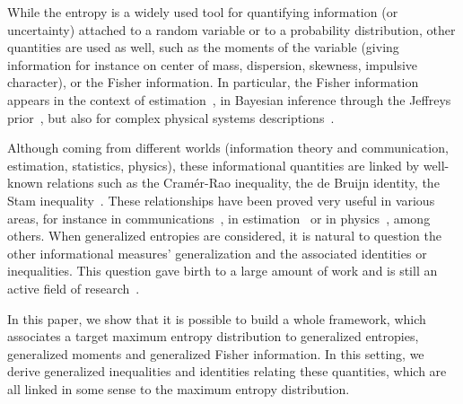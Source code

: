 \documentclass[entropy,article,submit,moreauthors,pdftex]{Definitions/mdpi}
\begin{document}
While  the  entropy is  a  widely  used  tool  for quantifying  information  (or
uncertainty) attached  to a  random variable or  to a  probability distribution,
other quantities are used  as well, such as the moments  of the variable (giving
information  for instance  on center  of mass,  dispersion, skewness,  impulsive
character), or  the Fisher information.   In particular, the  Fisher information
appears in the context of  estimation~\cite{Kay93, Fri04}, in Bayesian inference
through the  Jeffreys prior~\cite{Rob07, Jef46},  but also for  complex physical
systems  descriptions~\cite{Fri04,   VigBer03,  RomAng99,   RomSan06,  SanGon06,
  TorLop15}.


Although  coming from  different worlds  (information theory  and communication,
estimation, statistics,  physics), these informational quantities  are linked by
well-known  relations  such  as  the  Cram\'er-Rao  inequality,  the  de  Bruijn
identity, the Stam inequality~\cite{CovTho06, Sta59, DemCov91, GuoSha05}.  These
relationships have  been proved very  useful in  various areas, for  instance in
communications~\cite{Sta59, DemCov91,  CovTho06}, in  estimation~\cite{Kay93} or
in physics~\cite{FolSit97, Sen11}, among others.  When generalized entropies are
considered,  it  is  natural  to  question  the  other  informational  measures'
generalization and the associated identities or inequalities. This question gave
birth  to   a  large  amount   of  work  and  is   still  an  active   field  of
research~\cite{Vaj73,  Boe77,  Ham78,  BoeVan80, BurRao82,  LutYan04,  LutYan05,
  LutYan07, LutLv12, Ber12:06_1, Ber12:06_2, Ber13, Ber13:08}.

In this  paper, we show that  it is possible  to build a whole  framework, which
associates  a  target maximum  entropy  distribution  to generalized  entropies,
generalized moments  and generalized  Fisher information.   In this  setting, we
derive generalized inequalities and  identities relating these quantities, which
are all linked in some sense to the maximum entropy distribution.


\
\end{document}
